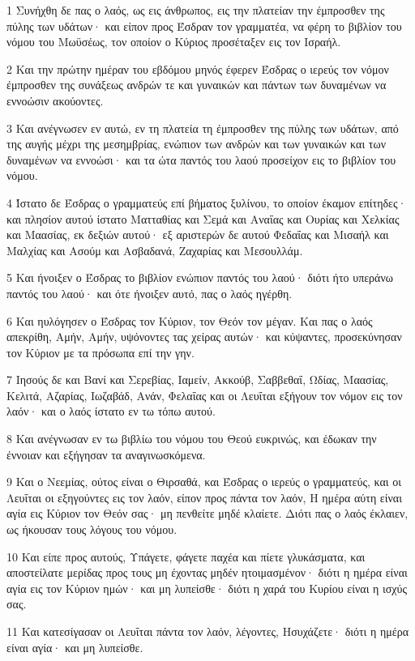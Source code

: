 \par 1 Συνήχθη δε πας ο λαός, ως εις άνθρωπος, εις την πλατείαν την έμπροσθεν της πύλης των υδάτων· και είπον προς Έσδραν τον γραμματέα, να φέρη το βιβλίον του νόμου του Μωϋσέως, τον οποίον ο Κύριος προσέταξεν εις τον Ισραήλ.
\par 2 Και την πρώτην ημέραν του εβδόμου μηνός έφερεν Έσδρας ο ιερεύς τον νόμον έμπροσθεν της συνάξεως ανδρών τε και γυναικών και πάντων των δυναμένων να εννοώσιν ακούοντες.
\par 3 Και ανέγνωσεν εν αυτώ, εν τη πλατεία τη έμπροσθεν της πύλης των υδάτων, από της αυγής μέχρι της μεσημβρίας, ενώπιον των ανδρών και των γυναικών και των δυναμένων να εννοώσι· και τα ώτα παντός του λαού προσείχον εις το βιβλίον του νόμου.
\par 4 Ίστατο δε Έσδρας ο γραμματεύς επί βήματος ξυλίνου, το οποίον έκαμον επίτηδες· και πλησίον αυτού ίστατο Ματταθίας και Σεμά και Αναΐας και Ουρίας και Χελκίας και Μαασίας, εκ δεξιών αυτού· εξ αριστερών δε αυτού Φεδαΐας και Μισαήλ και Μαλχίας και Ασούμ και Ασβαδανά, Ζαχαρίας και Μεσουλλάμ.
\par 5 Και ήνοιξεν ο Έσδρας το βιβλίον ενώπιον παντός του λαού· διότι ήτο υπεράνω παντός του λαού· και ότε ήνοιξεν αυτό, πας ο λαός ηγέρθη.
\par 6 Και ηυλόγησεν ο Έσδρας τον Κύριον, τον Θεόν τον μέγαν. Και πας ο λαός απεκρίθη, Αμήν, Αμήν, υψόνοντες τας χείρας αυτών· και κύψαντες, προσεκύνησαν τον Κύριον με τα πρόσωπα επί την γην.
\par 7 Ιησούς δε και Βανί και Σερεβίας, Ιαμείν, Ακκούβ, Σαββεθαΐ, Ωδίας, Μαασίας, Κελιτά, Αζαρίας, Ιωζαβάδ, Ανάν, Φελαΐας και οι Λευΐται εξήγουν τον νόμον εις τον λαόν· και ο λαός ίστατο εν τω τόπω αυτού.
\par 8 Και ανέγνωσαν εν τω βιβλίω του νόμου του Θεού ευκρινώς, και έδωκαν την έννοιαν και εξήγησαν τα αναγινωσκόμενα.
\par 9 Και ο Νεεμίας, ούτος είναι ο Θιρσαθά, και Έσδρας ο ιερεύς ο γραμματεύς, και οι Λευΐται οι εξηγούντες εις τον λαόν, είπον προς πάντα τον λαόν, Η ημέρα αύτη είναι αγία εις Κύριον τον Θεόν σας· μη πενθείτε μηδέ κλαίετε. Διότι πας ο λαός έκλαιεν, ως ήκουσαν τους λόγους του νόμου.
\par 10 Και είπε προς αυτούς, Υπάγετε, φάγετε παχέα και πίετε γλυκάσματα, και αποστείλατε μερίδας προς τους μη έχοντας μηδέν ητοιμασμένον· διότι η ημέρα είναι αγία εις τον Κύριον ημών· και μη λυπείσθε· διότι η χαρά του Κυρίου είναι η ισχύς σας.
\par 11 Και κατεσίγασαν οι Λευΐται πάντα τον λαόν, λέγοντες, Ησυχάζετε· διότι η ημέρα είναι αγία· και μη λυπείσθε.

